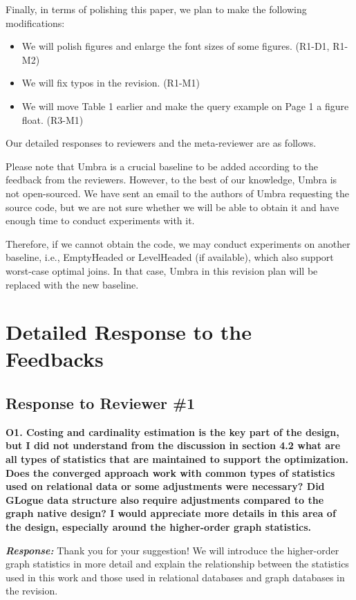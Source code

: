Finally, in terms of polishing this paper, we plan to make the following modifications:
\begin{itemize}
    \item We will polish figures and enlarge the font sizes of some figures. (R1-D1, R1-M2)
    \item We will fix typos in the revision. (R1-M1)
    \item We will move Table 1 earlier and make the query example on Page 1 a figure float. (R3-M1)
\end{itemize}

Our detailed responses to reviewers and the meta-reviewer are as follows.

Please note that Umbra is a crucial baseline to be added according to the feedback from the reviewers. However, to the best of our knowledge, Umbra is not open-sourced. We have sent an email to the authors of Umbra requesting the source code, but we are not sure whether we will be able to obtain it and have enough time to conduct experiments with it.

Therefore, if we cannot obtain the code, we may conduct experiments on another baseline, i.e., EmptyHeaded or LevelHeaded (if available), which also support worst-case optimal joins. In that case, Umbra in this revision plan will be replaced with the new baseline.


\section{Detailed Response to the Feedbacks}
\subsection{Response to Reviewer \#1}

\textbf{O1. Costing and cardinality estimation is the key part of the design, but I did not understand from the discussion in section 4.2 what are all types of statistics that are maintained to support the optimization. Does the converged approach work with common types of statistics used on relational data or some adjustments were necessary? Did GLogue data structure also require adjustments compared to the graph native design? I would appreciate more details in this area of the design, especially around the higher-order graph statistics.}

\begin{mdframed}[linewidth=0.5pt, linecolor=black]
\textbf{\textit{Response: }}
Thank you for your suggestion! We will introduce the higher-order graph statistics in more detail and explain the relationship between the statistics used in this work and those used in relational databases and graph databases in the revision.
\end{mdframed}



